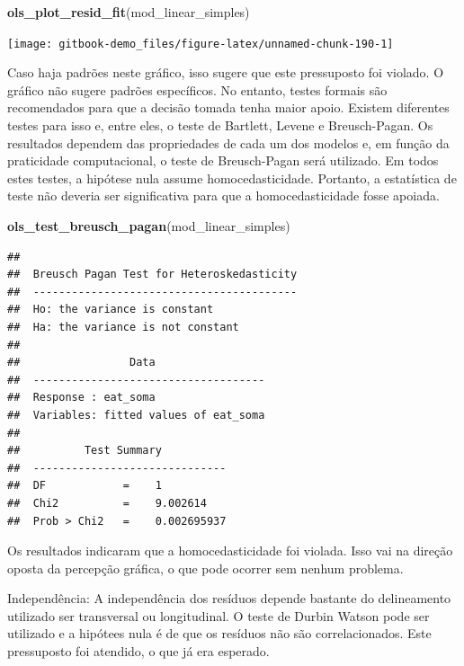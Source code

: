 \documentclass[
]{book}
\newenvironment{Shaded}{\begin{snugshade}}{\end{snugshade}}
\newcommand{\KeywordTok}[1]{\textcolor[rgb]{0.13,0.29,0.53}{\textbf{#1}}}
\newcommand{\NormalTok}[1]{#1}
\begin{document}
\begin{Shaded}
\begin{Highlighting}[]
\KeywordTok{ols_plot_resid_fit}\NormalTok{(mod_linear_simples)}
\end{Highlighting}
\end{Shaded}

\begin{center}\texttt{[image: gitbook-demo\_files/figure-latex/unnamed-chunk-190-1]} \end{center}

Caso haja padrões neste gráfico, isso sugere que este pressuposto foi violado. O gráfico não sugere padrões específicos. No entanto, testes formais são recomendados para que a decisão tomada tenha maior apoio. Existem diferentes testes para isso e, entre eles, o teste de Bartlett, Levene e Breusch-Pagan. Os resultados dependem das propriedades de cada um dos modelos e, em função da praticidade computacional, o teste de Breusch-Pagan será utilizado. Em todos estes testes, a hipótese nula assume homocedasticidade. Portanto, a estatística de teste não deveria ser significativa para que a homocedasticidade fosse apoiada.

\begin{Shaded}
\begin{Highlighting}[]
\KeywordTok{ols_test_breusch_pagan}\NormalTok{(mod_linear_simples)}
\end{Highlighting}
\end{Shaded}

\begin{verbatim}
## 
##  Breusch Pagan Test for Heteroskedasticity
##  -----------------------------------------
##  Ho: the variance is constant            
##  Ha: the variance is not constant        
## 
##                 Data                 
##  ------------------------------------
##  Response : eat_soma 
##  Variables: fitted values of eat_soma 
## 
##          Test Summary          
##  ------------------------------
##  DF            =    1 
##  Chi2          =    9.002614 
##  Prob > Chi2   =    0.002695937
\end{verbatim}

Os resultados indicaram que a homocedasticidade foi violada. Isso vai na direção oposta da percepção gráfica, o que pode ocorrer sem nenhum problema.

Independência: A independência dos resíduos depende bastante do delineamento utilizado ser transversal ou longitudinal. O teste de Durbin Watson pode ser utilizado e a hipótees nula é de que os resíduos não são correlacionados. Este pressuposto foi atendido, o que já era esperado.
\end{document}
